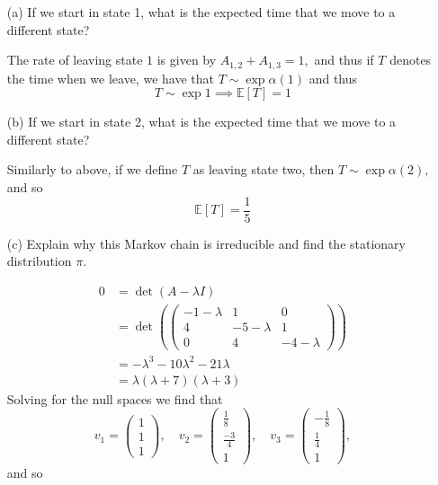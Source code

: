 \documentclass[11pt]{article}
\newcommand{\bbE}{\mathbb{E}}
\begin{document}
\begin{enumerate}
    \item[(a)] If we start in state 1, what is the expected time that we move to a different state?
    \begin{solution}
        The rate of leaving state $1$ is given by $A_{1,2} + A_{1,3} = 1,$ and thus if $T$ denotes the time when we leave, we have that $T\sim \exp{\alpha(1)}$ and thus \[T \sim \exp{1} \implies \boxed{\bbE[T] = 1}\]
    \end{solution}
    \item[(b)] If we start in state 2, what is the expected time that we move to a different state?
\begin{solution}
    Similarly to above, if we define $T$ as leaving state two, then $T\sim \exp{\alpha(2)},$ and so  \[\boxed{\bbE[T] = \frac{1}{5}}\]
\end{solution}
    \item[(c)] Explain why this Markov chain is irreducible and find the stationary distribution \(\pi\).
\begin{solution}
    \begin{align*}
         0 &= \det(A - \lambda I)\\
         &= \det(\begin{pmatrix}
             -1 - \lambda & 1 & 0\\
             4 & -5 - \lambda & 1\\
             0 & 4 & -4 - \lambda
         \end{pmatrix})\\
         &= -\lambda^3 - 10\lambda^2 - 21\lambda \\
         &= \lambda(\lambda + 7)(\lambda +3)
    \end{align*}
    Solving for the null spaces we find that 
    \[v_1 = \begin{pmatrix}
        1\\1\\1
    \end{pmatrix}, \quad v_2 = \begin{pmatrix}
        \frac{1}{8} \\
        \frac{-3}{4}\\
        1
    \end{pmatrix}, \quad v_3 = \begin{pmatrix}
        -\frac{1}{8}\\
        \frac{1}{4}\\
        1
    \end{pmatrix},\] and so 

\end{solution}
\end{enumerate}
\end{document}
